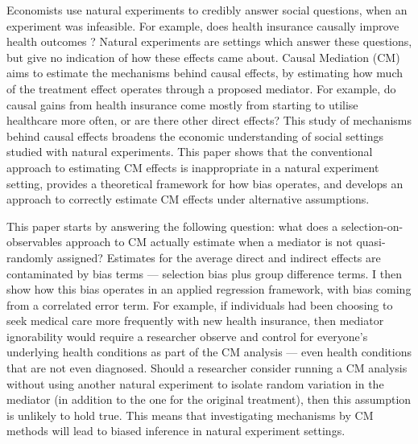 Economists use natural experiments to credibly answer social questions, when an experiment was infeasible.
For example, does health insurance causally improve health outcomes \citep{finkelstein2008oregon}?
Natural experiments are settings which answer these questions, but give no indication of how these effects came about.
Causal Mediation (CM) aims to estimate the mechanisms behind causal effects, by estimating how much of the treatment effect operates through a proposed mediator.
For example, do causal gains from health insurance come mostly from starting to utilise healthcare more often, or are there other direct effects?
This study of mechanisms behind causal effects broadens the economic understanding of social settings studied with natural experiments.
This paper shows that the conventional approach to estimating CM effects is inappropriate in a natural experiment setting, provides a theoretical framework for how bias operates, and develops an approach to correctly estimate CM effects under alternative assumptions.


This paper starts by answering the following question: what does a selection-on-observables approach to CM actually estimate when a mediator is not quasi-randomly assigned?
Estimates for the average direct and indirect effects are contaminated by bias terms --- selection bias plus group difference terms.
I then show how this bias operates in an applied regression framework, with bias coming from a correlated error term.
For example, if individuals had been choosing to seek medical care more frequently with new health insurance, then mediator ignorability would require a researcher observe and control for everyone's underlying health conditions as part of the CM analysis --- even health conditions that are not even diagnosed.
Should a researcher consider running a CM analysis without using another natural experiment to isolate random variation in the mediator (in addition to the one for the original treatment), then this assumption is unlikely to hold true.
This means that investigating mechanisms by CM methods will lead to biased inference in natural experiment settings.

